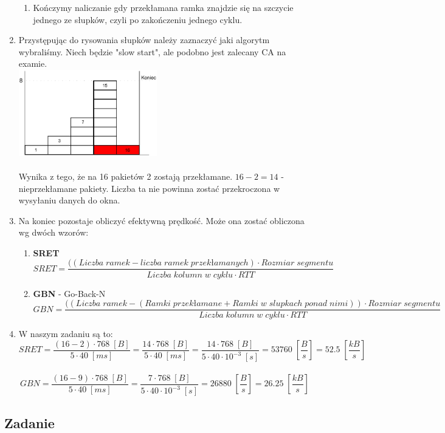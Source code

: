 \begin{enumerate}
\begin{enumerate}
					\item Kończymy naliczanie gdy przekłamana ramka znajdzie się na szczycie jednego ze słupków, czyli po zakończeniu jednego cyklu.
				\end{enumerate}
				\item Przystępując do rysowania słupków należy zaznaczyć jaki algorytm wybraliśmy. Niech będzie "slow start", ale podobno jest zalecany CA na examie.\\
				\includegraphics[width=6.0cm]{./images/zadanie07.pdf}\\\\
				Wynika z tego, że na 16 pakietów 2 zostają przekłamane. $ 16 - 2 = 14 $ - nieprzekłamane pakiety. Liczba ta nie powinna zostać przekroczona w wysyłaniu danych do okna.
				\item Na koniec pozostaje obliczyć efektywną prędkość. Może ona zostać obliczona wg dwóch wzorów:
				\begin{enumerate}
					\item \textbf{SRET}
					$$ SRET=\frac{((Liczba\;ramek - liczba\;ramek\;przekłamanych)\cdot Rozmiar\;segmentu}{Liczba\;kolumn\;w\;cyklu\cdot RTT} $$
					\item \textbf{GBN} - Go-Back-N
					$$ GBN=\frac{((Liczba\;ramek - (Ramki\;przekłamane + Ramki\;w\;slupkach\;ponad\;nimi))\cdot Rozmiar\;segmentu}{Liczba\;kolumn\;w\;cyklu\cdot RTT} $$
				\end{enumerate}
				\item W naszym zadaniu są to:
				$$ SRET=\frac{(16-2)\cdot 768\;[B]}{5\cdot 40\;[ms]}=\frac{14\cdot 768\;[B]}{5\cdot 40\;[ms]}=\frac{14\cdot 768\;[B]}{5\cdot 40\cdot 10^{-3}\;[s]}=53760\;[\frac{B}{s}]=52.5\; [\frac{kB}{s}]$$\\
				$$ GBN=\frac{(16-9)\cdot 768\;[B]}{5\cdot 40\;[ms]}=\frac{7\cdot 768\;[B]}{5\cdot 40\cdot 10^{-3}\;[s]}=26880\;[\frac{B}{s}]=26.25\;[\frac{kB}{s}] $$
			\end{enumerate}

	\subsection{Zadanie}
